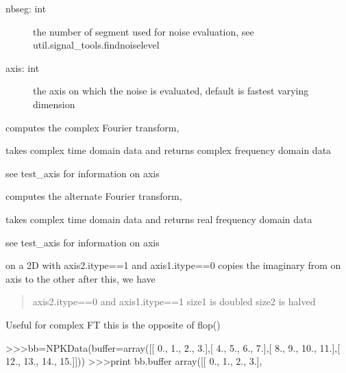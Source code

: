 \documentclass[letterpaper,10pt,openany,oneside]{sphinxmanual}
\begin{document}
\begin{fulllineitems}
\begin{fulllineitems}
\begin{description}
\item[{nbseg: int}] \leavevmode
the number of segment used for noise evaluation, see util.signal\_tools.findnoiselevel

\item[{axis: int}] \leavevmode
the axis on which the noise is evaluated, default is fastest varying dimension

\end{description}

\end{fulllineitems}


\begin{fulllineitems}
\label{rst/code:NPKData.NPKData.fft}
computes the complex Fourier transform,

takes complex time domain data and returns complex frequency domain data

see test\_axis for information on axis

\end{fulllineitems}


\begin{fulllineitems}
\label{rst/code:NPKData.NPKData.fftr}
computes the alternate Fourier transform,

takes complex time domain data and returns real frequency domain data

see test\_axis for information on axis

\end{fulllineitems}


\begin{fulllineitems}
\label{rst/code:NPKData.NPKData.flip}
on a 2D with axis2.itype==1 and axis1.itype==0
copies the imaginary from on axis to the other
after this, we have
\begin{quote}

axis2.itype==0 and axis1.itype==1
size1 is doubled
size2 is halved
\end{quote}

Useful for complex FT
this is the opposite of flop()

\textgreater{}\textgreater{}\textgreater{}bb=NPKData(buffer=array({[}{[}  0.,   1.,   2.,   3.{]},{[}  4.,   5.,   6.,   7.{]},{[}  8.,   9.,  10.,  11.{]},{[} 12.,  13.,  14.,  15.{]}{]}))
\textgreater{}\textgreater{}\textgreater{}print bb.buffer
array({[}{[}  0.,   1.,   2.,   3.{]},
\begin{quote}


\end{quote}
\end{fulllineitems}
\end{fulllineitems}
\end{document}

